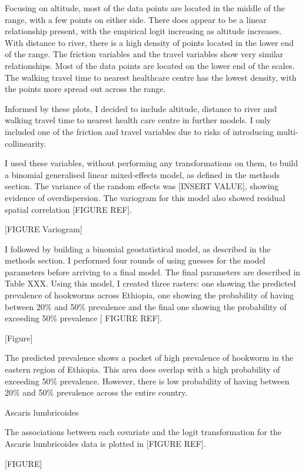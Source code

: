 \documentclass[
]{article}
\begin{document}
Focusing on altitude, most of the data points are located in the middle
of the range, with a few points on either side. There does appear to be
a linear relationship present, with the empirical logit increasing as
altitude increases. With distance to river, there is a high density of
points located in the lower end of the range. The friction variables and
the travel variables show very similar relationships. Most of the data
points are located on the lower end of the scales. The walking travel
time to nearest healthcare centre has the lowest density, with the
points more spread out across the range.

Informed by these plots, I decided to include altitude, distance to
river and walking travel time to nearest health care centre in further
models. I only included one of the friction and travel variables due to
risks of introducing multi-collinearity.

I used these variables, without performing any transformations on them,
to build a binomial generalised linear mixed-effects model, as defined
in the methods section. The variance of the random effects was {[}INSERT
VALUE{]}, showing evidence of overdispersion. The variogram for this
model also showed residual spatial correlation {[}FIGURE REF{]}.

{[}FIGURE Variogram{]}

I followed by building a binomial geostatistical model, as described in
the methods section. I performed four rounds of using guesses for the
model parameters before arriving to a final model. The final parameters
are described in Table XXX. Using this model, I created three rasters:
one showing the predicted prevalence of hookworms across Ethiopia, one
showing the probability of having between 20\% and 50\% prevalence and
the final one showing the probability of exceeding 50\% prevalence {[}
FIGURE REF{]}.

{[}Figure{]}

The predicted prevalence shows a pocket of high prevalence of hookworm
in the eastern region of Ethiopia. This area does overlap with a high
probability of exceeding 50\% prevalence. However, there is low
probability of having between 20\% and 50\% prevalence across the entire
country.

Ascaris lumbricoides

The associations between each covariate and the logit transformation for
the Ascaris lumbricoides data is plotted in {[}FIGURE REF{]}.

{[}FIGURE{]}
\end{document}
